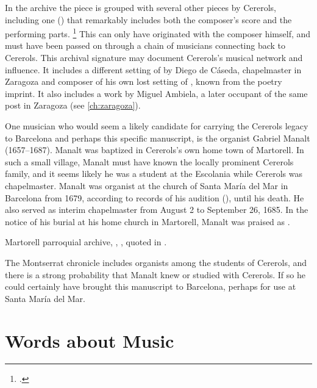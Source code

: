 In the archive the piece is grouped with several other pieces by Cererols,
including one () that remarkably includes
both the composer's score and the performing parts.%
    \footnote{.}
This can only have originated with the composer himself, and must have been
passed on through a chain of musicians connecting back to Cererols.
This archival signature may document Cererols's musical network and influence.
It includes a different setting of  by Diego
de Cáseda, chapelmaster in Zaragoza and composer of his own lost setting of
, known from the poetry imprint.
It also includes a work by Miguel Ambiela, a later occupant of the same post in
Zaragoza (see \cref{ch:zaragoza}).

One musician who would seem a likely candidate for carrying the Cererols legacy
to Barcelona and perhaps this specific manuscript, is the organist Gabriel
Manalt (1657--1687).
Manalt was baptized in Cererols's own home town of Martorell.
In such a small village, Manalt must have known the locally prominent Cererols
family, and it seems likely he was a student at the Escolania while Cererols was
chapelmaster.
Manalt was organist at the church of Santa María del Mar in Barcelona from 1679,
according to records of his audition (), until his death.%
    \citXXX[Manalt]
He also served as interim chapelmaster from August 2 to September 26, 1685.%
    \Autocite[70--71]{Balanza:CererolsFamily}
In the notice of his burial at his home church in Martorell, Manalt was praised
as .%
\begin{Footnote}
    Martorell parroquial archive, ,
    , quoted in 
    \autocite
    [{\XXX[original]}]
    [70]
    {Balanza:CererolsFamily}.
\end{Footnote}
The Montserrat chronicle includes organists among the students of Cererols, and
there is a strong probability that Manalt knew or studied with Cererols.
If so he could certainly have brought this manuscript to Barcelona, perhaps for
use at Santa María del Mar.

\section{Words about Music}

